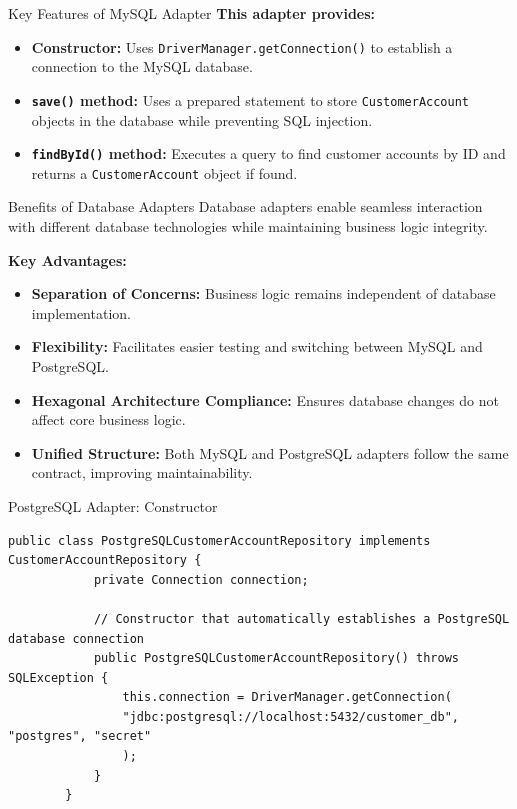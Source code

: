 \documentclass[aspectratio=169, table]{beamer}
\begin{document}
\begin{frame}[fragile]{Key Features of MySQL Adapter}
	\vspace{20pt}
	\textbf{This adapter provides:}
	\begin{itemize}
		\item \textbf{Constructor:} Uses \texttt{DriverManager.getConnection()} to establish a connection to the MySQL database.
		\item \textbf{\texttt{save()} method:} Uses a prepared statement to store \texttt{CustomerAccount} objects in the database while preventing SQL injection.
		\item \textbf{\texttt{findById()} method:} Executes a query to find customer accounts by ID and returns a \texttt{CustomerAccount} object if found.
	\end{itemize}
\end{frame}

\begin{frame}[fragile]{Benefits of Database Adapters}
	\vspace{20pt}
	Database adapters enable seamless interaction with different database technologies while maintaining business logic integrity.
	
	\textbf{Key Advantages:}
	\begin{itemize}
		\item \textbf{Separation of Concerns:} Business logic remains independent of database implementation.
		\item \textbf{Flexibility:} Facilitates easier testing and switching between MySQL and PostgreSQL.
		\item \textbf{Hexagonal Architecture Compliance:} Ensures database changes do not affect core business logic.
		\item \textbf{Unified Structure:} Both MySQL and PostgreSQL adapters follow the same contract, improving maintainability.
	\end{itemize}
\end{frame}


\begin{frame}[fragile]{PostgreSQL Adapter: Constructor}
	\vspace{20pt}
	\begin{lstlisting}[style=JavaStyle]
		public class PostgreSQLCustomerAccountRepository implements CustomerAccountRepository {
			private Connection connection;
			
			// Constructor that automatically establishes a PostgreSQL database connection
			public PostgreSQLCustomerAccountRepository() throws SQLException {
				this.connection = DriverManager.getConnection(
				"jdbc:postgresql://localhost:5432/customer_db", "postgres", "secret"
				);
			}
		}
	\end{lstlisting}
\end{frame}
\end{document}
